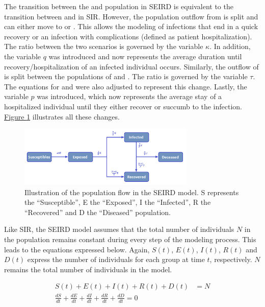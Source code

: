 The transition between the  and  population in SEIRD is equivalent to the transition
between  and  in SIR. However, the population outflow from  is split and can either move
to  or . This allows the modeling of infections that end in a quick recovery or an infection
with complications (defined as patient hospitalization). The ratio between the two scenarios is governed by the variable
$\kappa$. In addition, the variable $q$ was introduced and now represents the average duration until recovery/hospitalization of an
infected individual occurs. Similarly, the outflow of  is split between the populations of  and . The ratio is governed
by the variable $\tau$. The equations for  and  were also adjusted to represent this change. Lastly, the variable $p$ was
introduced, which now represents the average stay of a hospitalized individual until they either recover or succumb to the infection.
\hyperref[fig:SEIRD]{Figure \ref*{fig:SEIRD}} illustrates all these changes.\\

\begin{figure}
	\begin{center}
		\includegraphics[width=0.75\textwidth]{./figures/SEIRD.png}
		\caption{Illustration of the population flow in the SEIRD model. S represents the ``Susceptible'', E the ``Exposed'',
			I the ``Infected'', R the ``Recovered'' and D the ``Diseased'' population.}
		\label{fig:SEIRD}
	\end{center}
\end{figure}



Like SIR, the SEIRD model assumes that the total number of individuals $N$ in the population remains constant during every step
of the modeling process. This leads to the equations expressed below. Again, $S(t)$, $E(t)$, $I(t)$, $R(t)$ and $D(t)$ express
the number of individuals for each group at time $t$, respectively. $N$ remains the total number of individuals in the model.

\begin{align}
	\label{eq:SEIRD2}
	S(t) + E(t) + I(t) + R(t) + D(t) &= N \\
	\frac{dS}{dt} + \frac{dE}{dt}  + \frac{dI}{dt} + \frac{dR}{dt} + \frac{dD}{dt} = 0
\end{align}


